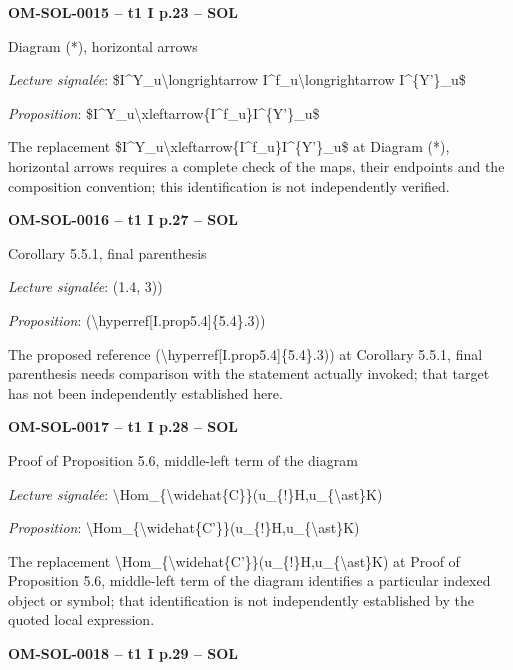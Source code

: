 \par\noindent\textbf{OM-SOL-0015 -- t1 I p.23 -- SOL}\par
Diagram (*), horizontal arrows\par
\emph{Lecture signalée}: \$I\textasciicircum{}Y\_u\textbackslash{}longrightarrow I\textasciicircum{}f\_u\textbackslash{}longrightarrow I\textasciicircum{}\{Y'\}\_u\$\par
\emph{Proposition}: \$I\textasciicircum{}Y\_u\textbackslash{}xleftarrow\{I\textasciicircum{}f\_u\}I\textasciicircum{}\{Y'\}\_u\$\par
The replacement \$I\textasciicircum{}Y\_u\textbackslash{}xleftarrow\{I\textasciicircum{}f\_u\}I\textasciicircum{}\{Y'\}\_u\$ at Diagram (*), horizontal arrows requires a complete check of the maps, their endpoints and the composition convention; this identification is not independently verified.\par
\par\noindent\textbf{OM-SOL-0016 -- t1 I p.27 -- SOL}\par
Corollary 5.5.1, final parenthesis\par
\emph{Lecture signalée}: (1.4, 3))\par
\emph{Proposition}: (\textbackslash{}hyperref[I.prop5.4]\{5.4\}.3))\par
The proposed reference (\textbackslash{}hyperref[I.prop5.4]\{5.4\}.3)) at Corollary 5.5.1, final parenthesis needs comparison with the statement actually invoked; that target has not been independently established here.\par
\par\noindent\textbf{OM-SOL-0017 -- t1 I p.28 -- SOL}\par
Proof of Proposition 5.6, middle-left term of the diagram\par
\emph{Lecture signalée}: \textbackslash{}Hom\_\{\textbackslash{}widehat\{C\}\}(u\_\{!\}H,u\_\{\textbackslash{}ast\}K)\par
\emph{Proposition}: \textbackslash{}Hom\_\{\textbackslash{}widehat\{C'\}\}(u\_\{!\}H,u\_\{\textbackslash{}ast\}K)\par
The replacement \textbackslash{}Hom\_\{\textbackslash{}widehat\{C'\}\}(u\_\{!\}H,u\_\{\textbackslash{}ast\}K) at Proof of Proposition 5.6, middle-left term of the diagram identifies a particular indexed object or symbol; that identification is not independently established by the quoted local expression.\par
\par\noindent\textbf{OM-SOL-0018 -- t1 I p.29 -- SOL}\par
